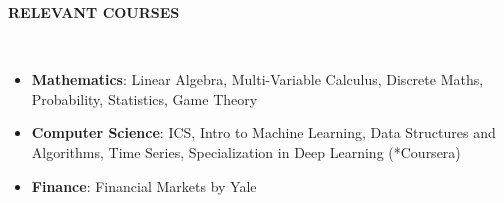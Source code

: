 \documentclass[a4paper,10pt]{article}
\newcommand{\resheading}[1]{{\small \colorbox{mygrey}{\begin{minipage}{0.99\textwidth}{\textbf{#1 \vphantom{p^{E}}}}\end{minipage}}}}
\begin{document}


\noindent
\resheading{\textbf{RELEVANT COURSES}}\\[-0.4cm]
\begin{itemize}
\setlength\itemsep{-0.4em}
\item \textbf{Mathematics}: Linear Algebra, Multi-Variable Calculus, Discrete Maths, Probability, Statistics, Game Theory
\item \textbf{Computer Science}: ICS, Intro to Machine Learning, Data Structures and Algorithms, Time Series, Specialization in Deep Learning (*Coursera)
\item \textbf{Finance}: Financial Markets by Yale
\end{itemize}
\end{document}
